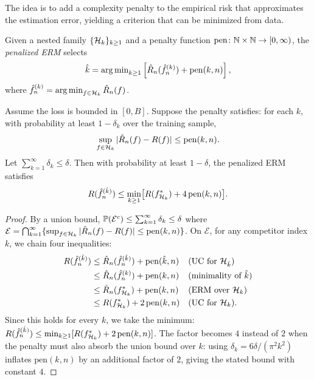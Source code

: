 \documentclass[11pt,a4paper]{article}
\begin{document}
The idea is to add a complexity penalty to the empirical risk that
approximates the estimation error, yielding a criterion that can be
minimized from data.

\begin{definition}
\label{def:penalized_erm}
Given a nested family $\{\mathcal{H}_k\}_{k \geq 1}$ and a penalty
function $\mathrm{pen} \colon \mathbb{N} \times \mathbb{N} \to [0, \infty)$, the
\emph{penalized ERM} selects
\[
    \hat{k} = \operatorname{arg\,min}_{k \geq 1} \left[\hat{R}_n(\hat{f}_n^{(k)})
    + \mathrm{pen}(k, n)\right],
\]
where $\hat{f}_n^{(k)} = \operatorname{arg\,min}_{f \in \mathcal{H}_k} \hat{R}_n(f)$.
\end{definition}

\begin{theorem}
\label{thm:oracle_penalized}
Assume the loss is bounded in $[0, B]$.  Suppose the penalty
satisfies: for each $k$, with probability at least $1 - \delta_k$
over the training sample,
\[
    \sup_{f \in \mathcal{H}_k} |\hat{R}_n(f) - R(f)|
    \leq \mathrm{pen}(k, n).
\]
Let $\sum_{k=1}^\infty \delta_k \leq \delta$.  Then with probability
at least $1 - \delta$, the penalized ERM satisfies
\[
    R(\hat{f}_n^{(\hat{k})})
    \leq \min_{k \geq 1} \bigl[R(f_{\mathcal{H}_k}^*)
    + 4\,\mathrm{pen}(k, n)\bigr].
\]
\end{theorem}

\begin{proof}
By a union bound, $\mathbb{P}(\mathcal{E}^c) \leq \sum_{k=1}^\infty
\delta_k \leq \delta$ where
$\mathcal{E} = \bigcap_{k=1}^\infty \{\sup_{f \in \mathcal{H}_k}
|\hat{R}_n(f) - R(f)| \leq \mathrm{pen}(k, n)\}$.
On $\mathcal{E}$, for any competitor index $k$, we chain four
inequalities:
\begin{align*}
    R(\hat{f}_n^{(\hat{k})})
    &\leq \hat{R}_n(\hat{f}_n^{(\hat{k})})
    + \mathrm{pen}(\hat{k}, n)
    && \text{(UC for } \mathcal{H}_{\hat{k}}\text{)} \\
    &\leq \hat{R}_n(\hat{f}_n^{(k)})
    + \mathrm{pen}(k, n)
    && \text{(minimality of } \hat{k}\text{)} \\
    &\leq \hat{R}_n(f_{\mathcal{H}_k}^*)
    + \mathrm{pen}(k, n)
    && \text{(ERM over } \mathcal{H}_k\text{)} \\
    &\leq R(f_{\mathcal{H}_k}^*) + 2\,\mathrm{pen}(k, n)
    && \text{(UC for } \mathcal{H}_k\text{)}.
\end{align*}
Since this holds for every $k$, we take the minimum:
$R(\hat{f}_n^{(\hat{k})}) \leq \min_{k \geq 1}
[R(f_{\mathcal{H}_k}^*) + 2\,\mathrm{pen}(k, n)]$.
The factor becomes $4$ instead of $2$ when the penalty must also
absorb the union bound over $k$: using
$\delta_k = 6\delta/(\pi^2 k^2)$ inflates
$\mathrm{pen}(k, n)$ by an additional factor of $2$, giving the
stated bound with constant $4$.
\end{proof}
\end{document}
